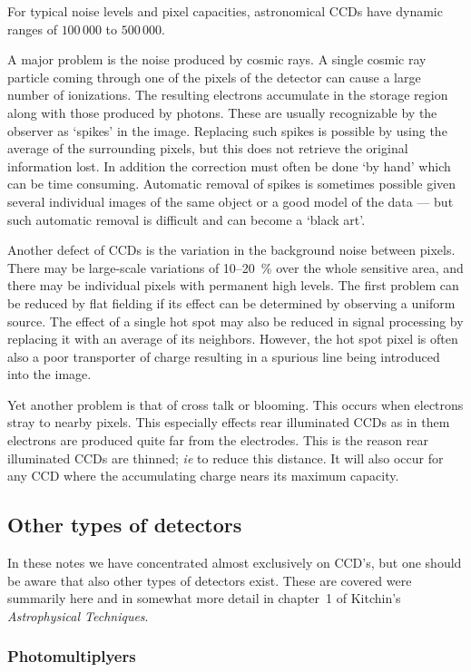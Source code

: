 \documentclass{article}
\begin{document}
For typical noise levels and pixel capacities, astronomical CCDs have dynamic
ranges of $100\,000$ to $500\,000$.

A major problem is the noise produced by cosmic rays. A single cosmic ray
particle coming through one of the pixels of the detector can cause a large
number of ionizations. The resulting electrons accumulate in the storage 
region along with those produced by photons. These are usually recognizable
by the observer as `spikes' in the image. Replacing such spikes is possible
by using the average of the surrounding pixels, but this does not retrieve 
the original information lost. In addition the correction must often be done
`by hand' which can be time consuming. Automatic removal of spikes is 
sometimes possible given several individual images of the same object or a 
good model of the data --- but such automatic removal is difficult and 
can become a `black art'. 

Another defect of CCDs is the variation in the background noise between 
pixels. There may be large-scale variations of 10--20~\% over the whole
sensitive area, and there may be individual pixels with permanent high levels.
The first problem can be reduced by flat fielding if its effect can be 
determined by observing a uniform source. The effect of a single hot spot
may also be reduced in signal processing by replacing it with an average of
its neighbors. However, the hot spot pixel is often also a poor transporter 
of charge resulting in a spurious line being introduced into the image.

Yet another problem is that of cross talk or blooming. This occurs when 
electrons stray to nearby pixels. This especially effects rear illuminated 
CCDs as in them electrons are produced quite far from the electrodes. This
is the reason rear illuminated CCDs are thinned; {\it ie} to reduce this 
distance. It will also occur for any CCD where the accumulating charge nears
its maximum capacity. 

\subsection*{Other types of detectors}

In these notes we have concentrated almost exclusively on CCD's, but one should
be aware that also other types of detectors exist. These are covered were
summarily here and in somewhat more detail in chapter~1 of Kitchin's 
{\it Astrophysical Techniques}.

\subsubsection*{Photomultiplyers}
\end{document}
